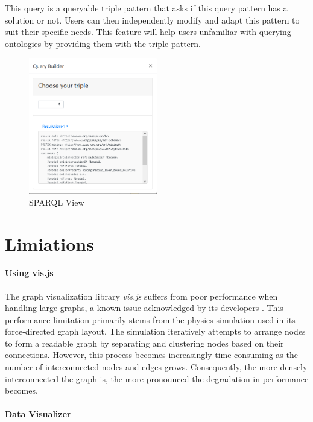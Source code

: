 This query is a queryable triple pattern that asks if this query pattern has a solution or not. 
Users can then independently modify and adapt this pattern to suit their specific needs. 
This feature will help users unfamiliar with querying ontologies by providing them with the triple pattern.
\begin{figure}[H]
    \includegraphics[width=0.5\textwidth]{Graphics/OwlVisualizer/queryBuilder5.png}
    \centering
    \caption{SPARQL View}
\end{figure}

\section{Limiations}

\paragraph{Using vis.js}

The graph visualization library \textit{vis.js} suffers from poor performance when handling large graphs, 
a known issue acknowledged by its developers \cite{visjs}. 
This performance limitation primarily stems from the physics simulation used in its force-directed graph layout. 
The simulation iteratively attempts to arrange nodes to form a readable graph by separating and clustering nodes based on their connections. 
However, this process becomes increasingly time-consuming as the number of interconnected nodes and edges grows. 
Consequently, the more densely interconnected the graph is, the more pronounced the degradation in performance becomes.

\paragraph{Data Visualizer}

